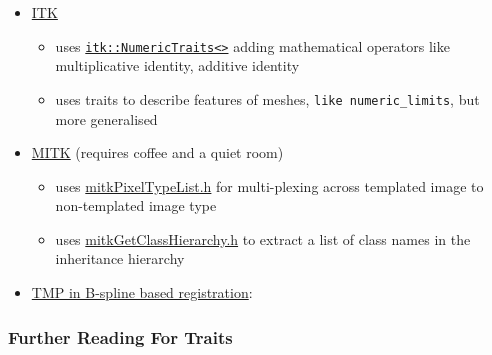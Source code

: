 \begin{itemize}
\itemsep1pt\parskip0pt
\item
  \href{http://www.itk.org}{ITK}

  \begin{itemize}
  \itemsep1pt\parskip0pt
  \item
    uses
    \href{http://www.itk.org/Doxygen/html/classitk_1_1NumericTraits.html}{\texttt{itk::NumericTraits\textless{}\textgreater{}}}
    adding mathematical operators like multiplicative identity, additive
    identity
  \item
    uses traits to describe features of meshes,
    \texttt{like numeric\_limits}, but more generalised
  \end{itemize}
\item
  \href{http://www.mitk.org}{MITK} (requires coffee and a quiet room)

  \begin{itemize}
  \itemsep1pt\parskip0pt
  \item
    uses
    \href{http://docs.mitk.org/2014.03/mitkPixelTypeList_8h.html}{mitkPixelTypeList.h}
    for multi-plexing across templated image to non-templated image type
  \item
    uses
    \href{http://docs.mitk.org/nightly-qt4/mitkGetClassHierarchy_8h.html}{mitkGetClassHierarchy.h}
    to extract a list of class names in the inheritance hierarchy
  \end{itemize}
\item
  \href{http://link.springer.com/chapter/10.1007\%2F978-3-319-08554-8_2}{TMP
  in B-spline based registration}:
\end{itemize}

\subsubsection{Further Reading For
Traits}\label{further-reading-for-traits}

